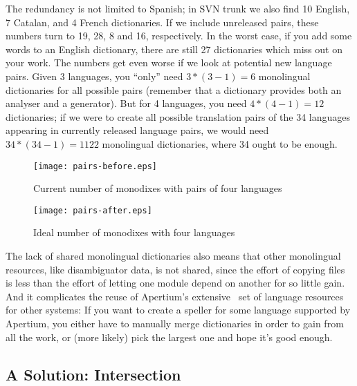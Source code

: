 \documentclass[10pt, a4paper]{article}
\begin{document}
The redundancy is not limited to Spanish; in SVN trunk we also find 10
English, 7 Catalan, and 4 French dictionaries. If we include
unreleased pairs, these numbers turn to 19, 28, 8 and 16,
respectively.
In the worst case, if you add some words to an English dictionary,
there are still 27 dictionaries which miss out on your work.  The
numbers get even worse if we look at potential new language pairs.
Given 3 languages, you ``only'' need $3*(3-1)=6$ monolingual
dictionaries for all possible pairs (remember that a dictionary
provides both an analyser and a generator). But for 4 languages, you
need $4*(4-1)=12$ dictionaries; if we were to  create all possible
translation pairs of the 34 languages appearing in currently released
language pairs, we would need $34*(34-1)=1122$ monolingual dictionaries,
where 34 ought to be enough.

\begin{figure}[h]
  \begin{center}
    \texttt{[image: pairs-before.eps]}
    \caption{Current number of monodixes with pairs of four languages}
    \label{fig:monodixes-current}
  \end{center}
\end{figure}

\begin{figure}[h]
  \begin{center}
    \texttt{[image: pairs-after.eps]}
    \caption{Ideal number of monodixes with four languages}
    \label{fig:monodixes-ideally}
  \end{center}
\end{figure}

The lack of shared monolingual dictionaries also means that other
monolingual resources, like disambiguator data, is not shared, since
the effort of copying files is less than the effort of letting one
module depend on another for so little gain. And it complicates the reuse
of Apertium's extensive~\cite{tyers2010fosresources} set of language
resources for other systems: If you want to create a speller for some
language supported by Apertium, you either have to manually merge
dictionaries in order to gain from all the work, or (more likely) pick
the largest one and hope it's good enough.

\subsection{A Solution: Intersection}
\label{sec:solution}
\end{document}
